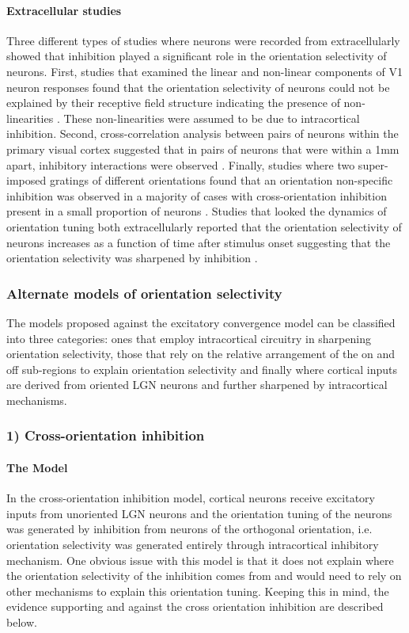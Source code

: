 \paragraph{Extracellular studies}

Three different types of studies where neurons were recorded from extracellularly showed that inhibition played a significant role in the orientation selectivity of neurons. First, studies that examined the linear and non-linear components of V1 neuron responses found that the orientation selectivity of neurons could not be explained by their receptive field structure indicating the presence of non-linearities \cite{Watkins1974, Gardner1999}. These non-linearities were assumed to be due to intracortical inhibition. Second, cross-correlation analysis between pairs of neurons within the primary visual cortex suggested that in pairs of neurons that were within a 1mm apart, inhibitory interactions were observed \cite{Hata1988}. Finally, studies where two super-imposed gratings of different orientations found that an orientation non-specific inhibition was observed in a majority of cases with cross-orientation inhibition present in a small proportion of neurons \cite{Bonds1989}. Studies that looked the dynamics of orientation tuning both extracellularly reported that the orientation selectivity of neurons increases as a function of time after stimulus onset suggesting that the orientation selectivity was sharpened by inhibition \cite{Shapley2003}.

\subsubsection{Alternate models of orientation selectivity}

The models proposed against the excitatory convergence model can be classified into three categories: ones that employ intracortical circuitry in sharpening orientation selectivity, those that rely on the relative arrangement of the on and off sub-regions to explain orientation selectivity and finally where cortical inputs are derived from oriented LGN neurons and further sharpened by intracortical mechanisms.

\subsubsection{1) Cross-orientation inhibition}

\paragraph{The Model} In the cross-orientation inhibition model, cortical neurons receive excitatory inputs from unoriented LGN neurons and the orientation tuning of the neurons was generated by inhibition from neurons of the orthogonal orientation, i.e. orientation selectivity was generated entirely through intracortical inhibitory mechanism. One obvious issue with this model is that it does not explain where the orientation selectivity of the inhibition comes from and would need to rely on other mechanisms to explain this orientation tuning. Keeping this in mind, the evidence supporting and against the cross orientation inhibition are described below. 

